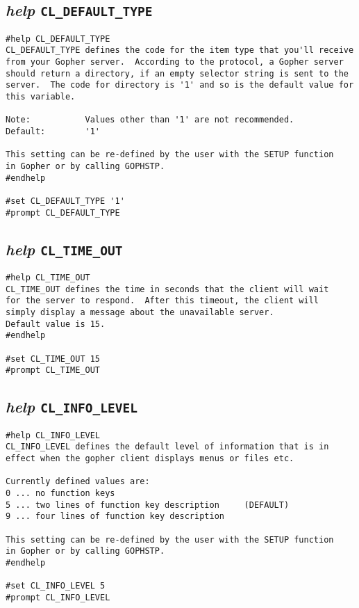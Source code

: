 \subsection{{\sl{help}} {\tt CL\_DEFAULT\_TYPE}}

\def\LPtopD{{\sl{help}} {\tt CL\_DEFAULT\_TYPE}}

\def\LPtopF{~}

\begin{verbatim}
#help CL_DEFAULT_TYPE
CL_DEFAULT_TYPE defines the code for the item type that you'll receive
from your Gopher server.  According to the protocol, a Gopher server
should return a directory, if an empty selector string is sent to the
server.  The code for directory is '1' and so is the default value for
this variable.

Note:           Values other than '1' are not recommended.
Default:        '1'

This setting can be re-defined by the user with the SETUP function
in Gopher or by calling GOPHSTP.
#endhelp

#set CL_DEFAULT_TYPE '1'
#prompt CL_DEFAULT_TYPE
\end{verbatim}

\subsection{{\sl{help}} {\tt CL\_TIME\_OUT}}

\def\LPtopD{{\sl{help}} {\tt CL\_TIME\_OUT}}

\def\LPtopF{~}

\begin{verbatim}
#help CL_TIME_OUT
CL_TIME_OUT defines the time in seconds that the client will wait
for the server to respond.  After this timeout, the client will
simply display a message about the unavailable server.
Default value is 15.
#endhelp

#set CL_TIME_OUT 15
#prompt CL_TIME_OUT
\end{verbatim}

\subsection{{\sl{help}} {\tt CL\_INFO\_LEVEL}}

\def\LPtopD{{\sl{help}} {\tt CL\_INFO\_LEVEL}}

\def\LPtopF{~}

\begin{verbatim}
#help CL_INFO_LEVEL
CL_INFO_LEVEL defines the default level of information that is in
effect when the gopher client displays menus or files etc.

Currently defined values are:
0 ... no function keys
5 ... two lines of function key description     (DEFAULT)
9 ... four lines of function key description

This setting can be re-defined by the user with the SETUP function
in Gopher or by calling GOPHSTP.
#endhelp

#set CL_INFO_LEVEL 5
#prompt CL_INFO_LEVEL
\end{verbatim}

